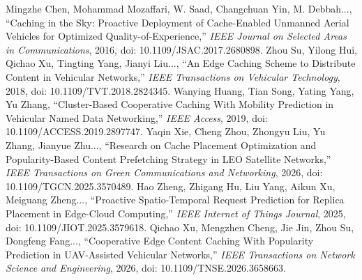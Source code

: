 Mingzhe Chen, Mohammad Mozaffari, W. Saad, Changchuan Yin, M. Debbah..., ``Caching in the Sky: Proactive Deployment of Cache-Enabled Unmanned Aerial Vehicles for Optimized Quality-of-Experience,'' \textit{IEEE Journal on Selected Areas in Communications}, 2016, doi: 10.1109/JSAC.2017.2680898.
Zhou Su, Yilong Hui, Qichao Xu, Tingting Yang, Jianyi Liu..., ``An Edge Caching Scheme to Distribute Content in Vehicular Networks,'' \textit{IEEE Transactions on Vehicular Technology}, 2018, doi: 10.1109/TVT.2018.2824345.
Wanying Huang, Tian Song, Yating Yang, Yu Zhang, ``Cluster-Based Cooperative Caching With Mobility Prediction in Vehicular Named Data Networking,'' \textit{IEEE Access}, 2019, doi: 10.1109/ACCESS.2019.2897747.
Yaqin Xie, Cheng Zhou, Zhongyu Liu, Yu Zhang, Jianyue Zhu..., ``Research on Cache Placement Optimization and Popularity-Based Content Prefetching Strategy in LEO Satellite Networks,'' \textit{IEEE Transactions on Green Communications and Networking}, 2026, doi: 10.1109/TGCN.2025.3570489.
Hao Zheng, Zhigang Hu, Liu Yang, Aikun Xu, Meiguang Zheng..., ``Proactive Spatio-Temporal Request Prediction for Replica Placement in Edge-Cloud Computing,'' \textit{IEEE Internet of Things Journal}, 2025, doi: 10.1109/JIOT.2025.3579618.
Qichao Xu, Mengzhen Cheng, Jie Jin, Zhou Su, Dongfeng Fang..., ``Cooperative Edge Content Caching With Popularity Prediction in UAV-Assisted Vehicular Networks,'' \textit{IEEE Transactions on Network Science and Engineering}, 2026, doi: 10.1109/TNSE.2026.3658663.


